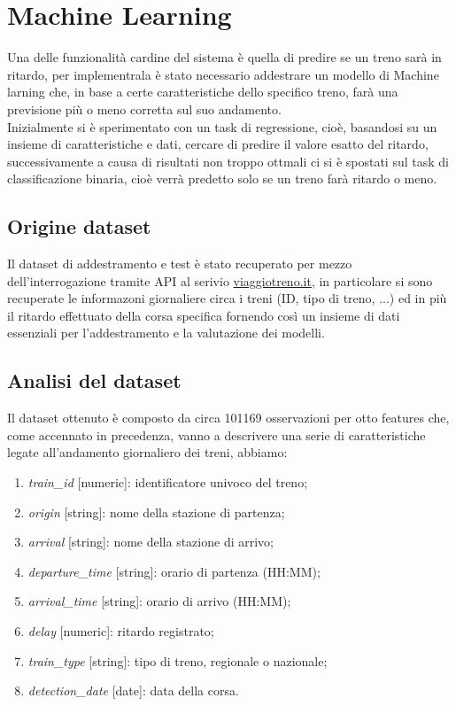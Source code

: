 \documentclass[italian,12pt,a4paper]{article}
\begin{document}
	\section{Machine Learning}
		Una delle funzionalità cardine del sistema è quella di predire se un treno sarà in ritardo, per implementrala è stato necessario addestrare un modello di Machine larning che, in base a certe caratteristiche dello specifico treno, farà una previsione più o meno corretta sul suo andamento. \\
		\linebreak
		Inizialmente si è sperimentato con un task di regressione, cioè, basandosi su un insieme di caratteristiche e dati, cercare di predire il valore esatto del ritardo, successivamente a causa di risultati non troppo ottmali ci si è spostati sul task di classificazione binaria, cioè verrà predetto solo se un treno farà ritardo o meno.
		
		\subsection{Origine dataset}
			Il dataset di addestramento e test è stato recuperato per mezzo dell'interrogazione tramite API al serivio 	\href{http://www.viaggiatreno.it/infomobilita/index.jsp}{viaggiotreno.it}, in particolare si sono recuperate le informazoni giornaliere circa i treni (ID, tipo di treno, ...) ed in più il ritardo effettuato della corsa specifica fornendo così un insieme di dati essenziali per l'addestramento e la valutazione dei modelli.
			
		\subsection{Analisi del dataset}
			Il dataset ottenuto è composto da circa 101169 osservazioni per otto features che, come accennato in precedenza, vanno a descrivere una serie di caratteristiche legate all'andamento giornaliero dei treni, abbiamo:
			
			\begin{enumerate}
				\item \textit{train\_id} [numeric]: identificatore univoco del treno;
				\item \textit{origin} [string]: nome della stazione di partenza;
				\item \textit{arrival} [string]: nome della stazione di arrivo;
				\item \textit{departure\_time} [string]: orario di partenza (HH:MM);
				\item \textit{arrival\_time} [string]: orario di arrivo (HH:MM);
				\item \textit{delay} [numeric]: ritardo registrato;
				\item \textit{train\_type} [string]: tipo di treno, regionale o nazionale;
				\item \textit{detection\_date} [date]: data della corsa.
			\end{enumerate}
			
\end{document}
